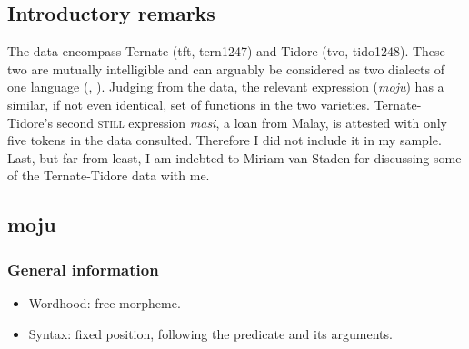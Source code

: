 \subsection{Introductory remarks}
The data encompass Ternate (tft, tern1247) and Tidore (tvo, tido1248). These two are mutually intelligible and can arguably be considered as two dialects of one language (\cite{Voorhoeve1987}, \citeyear{Voorhoeve1988}). Judging from the data, the relevant expression (\textit{moju}) has a similar, if not even identical, set of functions in the two varieties. Ternate-Tidore's second  \textsc{still} expression \textit{masi}, a loan from Malay, is attested with only five tokens in the data consulted. Therefore I did not include it in my sample. Last, but far from least, I am indebted to Miriam van Staden for discussing some of the Ternate-Tidore data with me. 

\subsection{moju}

\subsubsection{General information}
\begin{itemize}
	\item Wordhood: free morpheme.
	\item Syntax: fixed position, following the predicate and its arguments.
\end{itemize}

